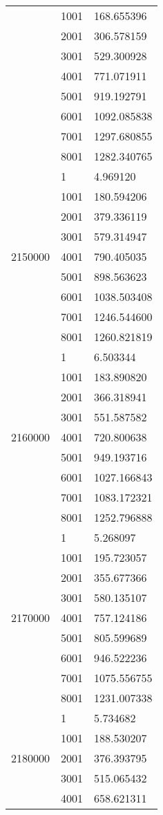 \begin{table}[htb!]
\begin{tabular}{lll}
 & 1001 & 168.655396 \\
 & 2001 & 306.578159 \\
 & 3001 & 529.300928 \\
 & 4001 & 771.071911 \\
 & 5001 & 919.192791 \\
 & 6001 & 1092.085838 \\
 & 7001 & 1297.680855 \\
 & 8001 & 1282.340765 \\
\multirow[c]{9}{*}{2150000} & 1 & 4.969120 \\
 & 1001 & 180.594206 \\
 & 2001 & 379.336119 \\
 & 3001 & 579.314947 \\
 & 4001 & 790.405035 \\
 & 5001 & 898.563623 \\
 & 6001 & 1038.503408 \\
 & 7001 & 1246.544600 \\
 & 8001 & 1260.821819 \\
\multirow[c]{9}{*}{2160000} & 1 & 6.503344 \\
 & 1001 & 183.890820 \\
 & 2001 & 366.318941 \\
 & 3001 & 551.587582 \\
 & 4001 & 720.800638 \\
 & 5001 & 949.193716 \\
 & 6001 & 1027.166843 \\
 & 7001 & 1083.172321 \\
 & 8001 & 1252.796888 \\
\multirow[c]{9}{*}{2170000} & 1 & 5.268097 \\
 & 1001 & 195.723057 \\
 & 2001 & 355.677366 \\
 & 3001 & 580.135107 \\
 & 4001 & 757.124186 \\
 & 5001 & 805.599689 \\
 & 6001 & 946.522236 \\
 & 7001 & 1075.556755 \\
 & 8001 & 1231.007338 \\
\multirow[c]{9}{*}{2180000} & 1 & 5.734682 \\
 & 1001 & 188.530207 \\
 & 2001 & 376.393795 \\
 & 3001 & 515.065432 \\
 & 4001 & 658.621311 \\

\end{tabular}
\end{table}
